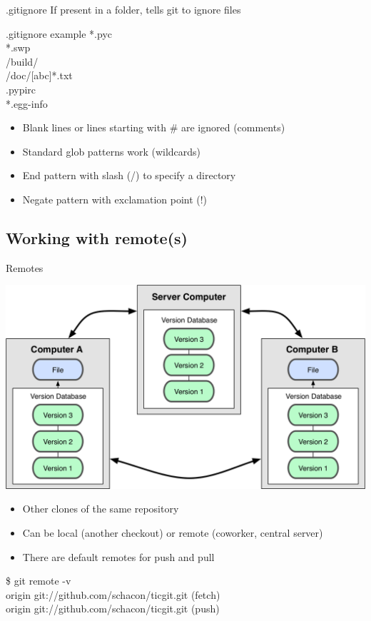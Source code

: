 \documentclass[10pt,xcolor=dvipsnames]{beamer}
\begin{document}
\begin{frame}{.gitignore}
If present in a folder, tells git to ignore files
\begin{block}{.gitignore example}
*.pyc\\
*.swp\\
/build/\\
/doc/[abc]*.txt\\
.pypirc\\
*.egg-info\\
\end{block}
\begin{itemize}
\item Blank lines or lines starting with \# are ignored (comments)
\item Standard glob patterns work (wildcards)
\item End pattern with slash (/) to specify a directory
\item Negate pattern with exclamation point (!) 
\end{itemize}
\end{frame}
\subsection{Working with remote(s)}

\begin{frame}{Remotes}
\begin{center}
\includegraphics [scale=0.2]{VCS_distributed.png}\\[0.2in]
\end{center}
\begin{itemize}
\item Other clones of the same repository
\item Can be local (another checkout) or remote (coworker, central server)
\item There are default remotes for push and pull 
\end{itemize}
\begin{block}{}
\$ git remote -v \\
origin git://github.com/schacon/ticgit.git (fetch) \\
origin git://github.com/schacon/ticgit.git (push)
\end{block}
\end{frame}
\end{document}
